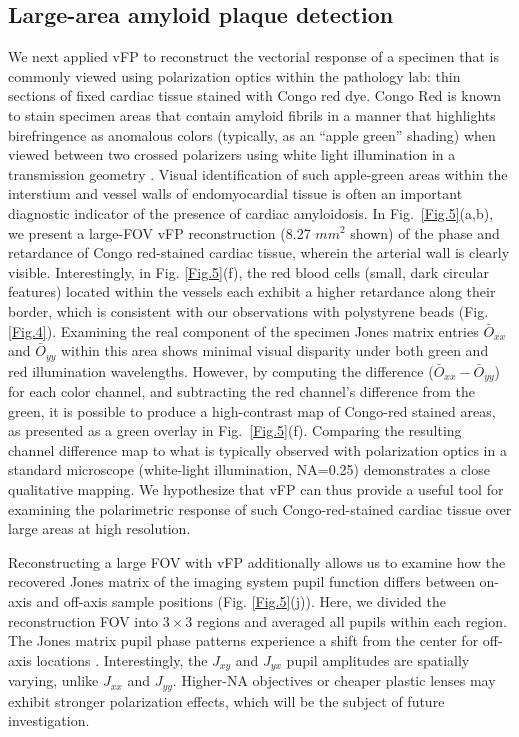 \documentclass{article}
\begin{document}
\subsection{Large-area amyloid plaque detection}
We next applied vFP to reconstruct the vectorial response of a specimen that is commonly viewed using polarization optics within the pathology lab: thin sections of fixed cardiac tissue stained with Congo red dye. Congo Red is known to stain specimen areas that contain amyloid fibrils in a manner that highlights birefringence as anomalous colors (typically, as an “apple green” shading) when viewed between two crossed polarizers using white light illumination in a transmission geometry \cite{howie2008physical}. Visual identification of such apple-green areas within the interstium and vessel walls of endomyocardial tissue is often an important diagnostic indicator of the presence of cardiac amyloidosis. In Fig.~\ref{Fig.5}(a,b), we present a large-FOV vFP reconstruction (8.27 $mm^2$ shown) of the phase and retardance of Congo red-stained cardiac tissue, wherein the arterial wall is clearly visible. Interestingly, in Fig. \ref{Fig.5}(f), the red blood cells (small, dark circular features) located within the vessels each exhibit a higher retardance along their border, which is consistent with our observations with polystyrene beads (Fig. \ref{Fig.4}). Examining the real component of the specimen Jones matrix entries $\bar{O}_{xx}$ and $\bar{O}_{yy}$ within this area shows minimal visual disparity under both green and red illumination wavelengths. However, by computing the difference ($\bar{O}_{xx} - \bar{O}_{yy}$) for each color channel, and subtracting the red channel's difference from the green, it is possible to produce a high-contrast map of Congo-red stained areas, as presented as a green overlay in Fig.~\ref{Fig.5}(f). Comparing the resulting channel difference map to what is typically observed with polarization optics in a standard microscope (white-light illumination, NA=0.25) demonstrates a close qualitative mapping. We hypothesize that vFP can thus provide a useful tool for examining the polarimetric response of such Congo-red-stained cardiac tissue over large areas at high resolution. 

Reconstructing a large FOV with vFP additionally allows us to examine how the recovered Jones matrix of the imaging system pupil function differs between on-axis and off-axis sample positions (Fig. \ref{Fig.5}(j)). Here, we divided the reconstruction FOV into $3\times3$ regions and averaged all pupils within each region. The Jones matrix pupil phase patterns experience a shift from the center for off-axis locations \cite{mcguire1994polarization}. Interestingly, the $J_{xy}$ and $J_{yx}$ pupil amplitudes are spatially varying, unlike $J_{xx}$ and $J_{yy}$. Higher-NA objectives or cheaper plastic lenses may exhibit stronger polarization effects, which will be the subject of future investigation.
\end{document}
